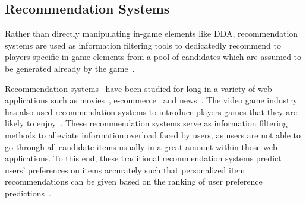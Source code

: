 





\subsection{Recommendation Systems}
Rather than directly manipulating in-game elements like DDA, recommendation systems are used as information filtering tools to dedicatedly recommend to players specific in-game elements from a pool of candidates which are assumed to be generated already by the game~\cite{medler2011using}.


Recommendation systems~\cite{isinkaye2015recommendation,bobadilla2013recommender,resnick1997recommender,adomavicius2005toward} have been studied for long in a variety of web applications such as movies~\cite{amatriain2012netflix}, e-commerce~\cite{linden2003amazon} and news~\cite{das2007google}. The video game industry has also used recommendation systems to introduce players games that they are likely to enjoy~\cite{sifa2014archetypal,orland10,skocir2012mars,wu2017recommendation}. These recommendation systems serve as information filtering methods to alleviate information overload faced by users, as users are not able to go through all candidate items usually in a great amount within those web applications. To this end, these traditional recommendation systems predict users' preferences on items accurately such that personalized item recommendations can be given based on the ranking of user preference predictions~\cite{liang2006personalized}. 

